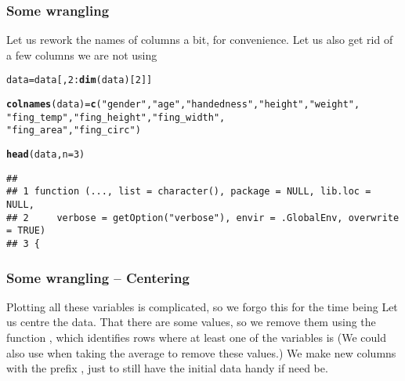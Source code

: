 \documentclass[aspectratio=169]{beamer}\usepackage[]{graphicx}\usepackage[]{xcolor}
\makeatletter
\newcommand{\hlnum}[1]{\textcolor[rgb]{0.686,0.059,0.569}{#1}}%
\newcommand{\hlsng}[1]{\textcolor[rgb]{0.192,0.494,0.8}{#1}}%
\newcommand{\hlopt}[1]{\textcolor[rgb]{0,0,0}{#1}}%
\newcommand{\hldef}[1]{\textcolor[rgb]{0.345,0.345,0.345}{#1}}%
\newcommand{\hlkwb}[1]{\textcolor[rgb]{0.69,0.353,0.396}{#1}}%
\newcommand{\hlkwc}[1]{\textcolor[rgb]{0.333,0.667,0.333}{#1}}%
\newcommand{\hlkwd}[1]{\textcolor[rgb]{0.737,0.353,0.396}{\textbf{#1}}}%
\newenvironment{kframe}{%
 \def\at@end@of@kframe{}%
 \ifinner\ifhmode%
  \def\at@end@of@kframe{\end{minipage}}%
  \begin{minipage}{\columnwidth}%
 \fi\fi%
 \def\FrameCommand##1{\hskip\@totalleftmargin \hskip-\fboxsep
 \colorbox{shadecolor}{##1}\hskip-\fboxsep
     \hskip-\linewidth \hskip-\@totalleftmargin \hskip\columnwidth}%
 \MakeFramed {\advance\hsize-\width
   \@totalleftmargin\z@ \linewidth\hsize
   \@setminipage}}%
 {\par\unskip\endMakeFramed%
 \at@end@of@kframe}
\newenvironment{knitrout}{}{} %
\makeatother
\begin{document}
\begin{frame}[fragile]\frametitle{Some wrangling}
Let us rework the names of columns a bit, for convenience. Let us also get rid of a few columns we are not using
\vfill
\begin{knitrout}
\color{fgcolor}\begin{kframe}
\begin{alltt}
\hldef{data} \hlkwb{=} \hldef{data[,}\hlnum{2}\hlopt{:}\hlkwd{dim}\hldef{(data)[}\hlnum{2}\hldef{]]}
\end{alltt}


{\ttfamily\noindent\bfseries\color{errorcolor}{\#\# Error in 2:dim(data)[2]: argument of length 0}}\begin{alltt}
\hlkwd{colnames}\hldef{(data)} \hlkwb{=} \hlkwd{c}\hldef{(}\hlsng{"gender"}\hldef{,} \hlsng{"age"}\hldef{,} \hlsng{"handedness"}\hldef{,} \hlsng{"height"}\hldef{,} \hlsng{"weight"}\hldef{,}
                  \hlsng{"fing_temp"}\hldef{,} \hlsng{"fing_height"}\hldef{,} \hlsng{"fing_width"}\hldef{,}
                  \hlsng{"fing_area"}\hldef{,} \hlsng{"fing_circ"}\hldef{)}
\end{alltt}


{\ttfamily\noindent\bfseries{}}\begin{alltt}
\hlkwd{head}\hldef{(data,} \hlkwc{n}\hldef{=}\hlnum{3}\hldef{)}
\end{alltt}
\begin{verbatim}
##                                                                             
## 1 function (..., list = character(), package = NULL, lib.loc = NULL,        
## 2     verbose = getOption("verbose"), envir = .GlobalEnv, overwrite = TRUE) 
## 3 {
\end{verbatim}
\end{kframe}
\end{knitrout}
\end{frame}



\begin{frame}\frametitle{Some wrangling -- Centering}
Plotting all these variables is complicated, so we forgo this for the time being
\vfill
Let us centre the data. That there are some  values, so we remove them using the function , which identifies rows where at least one of the variables is 
\vfill
(We could also use  when taking the average to remove these values.) 
\vfill
We make new columns with the prefix , just to still have the initial data handy if need be.
\end{frame}
\end{document}
